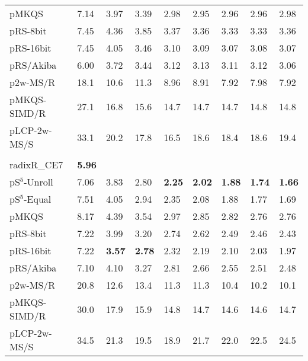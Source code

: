 \documentclass[a4paper]{myjournal}
\begin{document}
\begin{table}
\begin{tabularx}{\linewidth}{l|*{8}{>{\hfill}X}|@{}}
        pMKQS &     7.14 &     3.97 &     3.39 &     2.98 &     2.95 &     2.96 &     2.96 &     2.98 \\
     pRS-8bit &     7.45 &     4.36 &     3.85 &     3.37 &     3.36 &     3.33 &     3.33 &     3.36 \\
    pRS-16bit &     7.45 &     4.05 &     3.46 &     3.10 &     3.09 &     3.07 &     3.08 &     3.07 \\
    pRS/Akiba &     6.00 &     3.72 &     3.44 &     3.12 &     3.13 &     3.11 &     3.12 &     3.06 \\
     p2w-MS/R &     18.1 &     10.6 &     11.3 &     8.96 &     8.91 &     7.92 &     7.98 &     7.92 \\
 pMKQS-SIMD/R &     27.1 &     16.8 &     15.6 &     14.7 &     14.7 &     14.7 &     14.8 &     14.8 \\
 pLCP-2w-MS/S &     33.1 &     20.2 &     17.8 &     16.5 &     18.6 &     18.4 &     18.6 &     19.4 \\ \hline
& \multicolumn{8}{l|}{\textbf{Sinha NoDup} (complete), $n = 31.6\,\text{M}$, $N = 382\,\text{Mi}$, $\frac{D}{N} = 73.4\,\%$} \\ \cline{2-9}
radixR\_CE7 & \bf 5.96 &  &  &  &  &  &  &  \\
pS$^5$-Unroll & 7.06 &     3.83 &     2.80 & \bf 2.25 & \bf 2.02 & \bf 1.88 & \bf 1.74 & \bf 1.66 \\
 pS$^5$-Equal & 7.51 &     4.05 &     2.94 &     2.35 &     2.08 &     1.88 &     1.77 &     1.69 \\
        pMKQS & 8.17 &     4.39 &     3.54 &     2.97 &     2.85 &     2.82 &     2.76 &     2.76 \\
     pRS-8bit & 7.22 &     3.99 &     3.20 &     2.74 &     2.62 &     2.49 &     2.46 &     2.43 \\
    pRS-16bit & 7.22 & \bf 3.57 & \bf 2.78 &     2.32 &     2.19 &     2.10 &     2.03 &     1.97 \\
    pRS/Akiba & 7.10 &     4.10 &     3.27 &     2.81 &     2.66 &     2.55 &     2.51 &     2.48 \\
     p2w-MS/R & 20.8 &     12.6 &     13.4 &     11.3 &     11.3 &     10.4 &     10.2 &     10.1 \\
 pMKQS-SIMD/R & 30.0 &     17.9 &     15.9 &     14.8 &     14.7 &     14.6 &     14.6 &     14.7 \\
 pLCP-2w-MS/S & 34.5 &     21.3 &     19.5 &     18.9 &     21.7 &     22.0 &     22.5 &     24.5 \\ \hline
\end{tabularx}
\end{table}
\end{document}
